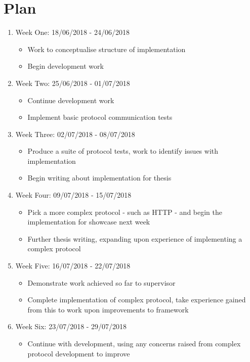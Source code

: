 \documentclass{article}
\begin{document}
	\section{Plan}
	\begin{enumerate}
		\item Week One: 18/06/2018 - 24/06/2018
		\begin{itemize}
			\item Work to conceptualise structure of implementation
			\item Begin development work
		\end{itemize}
		\item Week Two: 25/06/2018 - 01/07/2018
		\begin{itemize}
			\item Continue development work
			\item Implement basic protocol communication tests
		\end{itemize}
		\item Week Three: 02/07/2018 - 08/07/2018
		\begin{itemize}
			\item Produce a suite of protocol tests, work to identify issues with implementation
			\item Begin writing about implementation for thesis
		\end{itemize}
		\item Week Four: 09/07/2018 - 15/07/2018
		\begin{itemize}
			\item Pick a more complex protocol - such as HTTP - and begin the implementation for showcase next week
			\item Further thesis writing, expanding upon experience of implementing a complex protocol
		\end{itemize}
		\item Week Five: 16/07/2018 - 22/07/2018
		\begin{itemize}
			\item Demonstrate work achieved so far to supervisor
			\item Complete implementation of complex protocol, take experience gained from this to work upon improvements to framework
		\end{itemize}
		\item Week Six: 23/07/2018 - 29/07/2018
		\begin{itemize}
			\item Continue with development, using any concerns raised from complex protocol development to improve

\end{itemize}
\end{enumerate}
\end{document}
